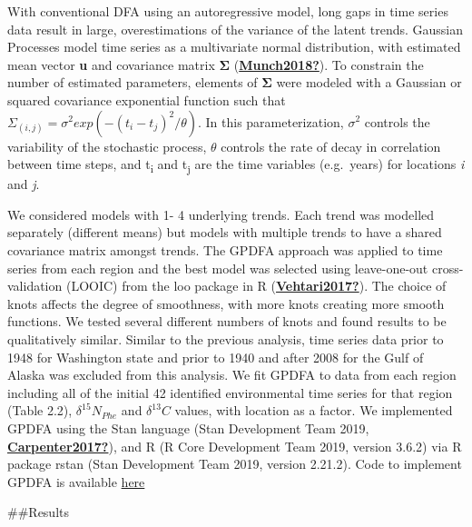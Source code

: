 \documentclass [11pt, proquest] {uwthesis}[2015/03/03]
\begin{document}
With conventional DFA using an autoregressive model, long gaps in time series data result in large, overestimations of the variance of the latent trends. Gaussian Processes model time series as a multivariate normal distribution, with estimated mean vector \textbf{u} and covariance matrix \textbf{Σ} (\protect\hyperlink{ref-Munch2018}{\textbf{Munch2018?}}). To constrain the number of estimated parameters, elements of \textbf{Σ} were modeled with a Gaussian or squared covariance exponential function such that \(\Sigma_{(i,j)}= \sigma^2 exp(-(t_i-t_j )^2/\theta)\). In this parameterization, \(\sigma^2\) controls the variability of the stochastic process, \(\theta\) controls the rate of decay in correlation between time steps, and t\textsubscript{i} and t\textsubscript{j} are the time variables (e.g.~years) for locations \emph{i} and \emph{j}.

We considered models with 1- 4 underlying trends. Each trend was modelled separately (different means) but models with multiple trends to have a shared covariance matrix amongst trends. The GPDFA approach was applied to time series from each region and the best model was selected using leave-one-out cross-validation (LOOIC) from the loo package in R (\protect\hyperlink{ref-Vehtari2017}{\textbf{Vehtari2017?}}). The choice of knots affects the degree of smoothness, with more knots creating more smooth functions. We tested several different numbers of knots and found results to be qualitatively similar. Similar to the previous analysis, time series data prior to 1948 for Washington state and prior to 1940 and after 2008 for the Gulf of Alaska was excluded from this analysis. We fit GPDFA to data from each region including all of the initial 42 identified environmental time series for that region (Table 2.2), \(\delta^{15}N_{Phe}\) and \(\delta^{13}C\) values, with location as a factor. We implemented GPDFA using the Stan language (Stan Development Team 2019, \protect\hyperlink{ref-Carpenter2017}{\textbf{Carpenter2017?}}), and R (R Core Development Team 2019, version 3.6.2) via R package rstan (Stan Development Team 2019, version 2.21.2). Code to implement GPDFA is available \href{https://github.com/mfeddern/CSIA-AA/blob/master/SourceData/Src/Analysis/gpdfa.stan}{here}

\#\#Results
\end{document}
